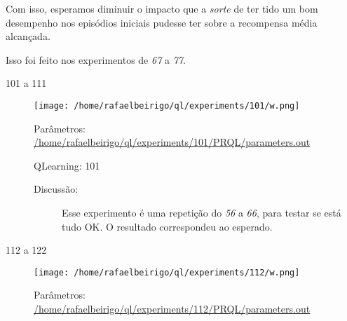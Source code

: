 \documentclass[11pt]{article}
\begin{document}
\begin{description}
\begin{description}
\begin{description}
\begin{description}
\begin{description}
Com isso, esperamos diminuir o impacto que a \emph{sorte} de ter tido um bom
desempenho nos episódios iniciais pudesse ter sobre a recompensa média
alcançada.

Isso foi feito nos experimentos de \emph{67} a \emph{77}.

\end{description}
\end{description}
\begin{description}

\item[101 a 111]\label{sec-11.1.2.1.3.1.2}


\centerline{\texttt{[image: /home/rafaelbeirigo/ql/experiments/101/w.png]}}


\begin{description}

\item[Parâmetros: \href{file:///home/rafaelbeirigo/ql/experiments/101/PRQL/parameters.out}{/home/rafaelbeirigo/ql/experiments/101/PRQL/parameters.out}]\label{sec-11.1.2.1.3.1.2.1}


\end{description}
\begin{description}

\item[QLearning: 101]\label{sec-11.1.2.1.3.1.2.2}


\end{description}
\begin{description}

\item[Discussão:]\label{sec-11.1.2.1.3.1.2.3}


Esse experimento é uma repetição do \emph{56} a \emph{66}, para testar se está tudo OK.
O resultado correspondeu ao esperado.

\end{description}
\end{description}
\begin{description}

\item[112 a 122]\label{sec-11.1.2.1.3.1.3}


\centerline{\texttt{[image: /home/rafaelbeirigo/ql/experiments/112/w.png]}}


\begin{description}

\item[Parâmetros: \href{file:///home/rafaelbeirigo/ql/experiments/112/PRQL/parameters.out}{/home/rafaelbeirigo/ql/experiments/112/PRQL/parameters.out}]\label{sec-11.1.2.1.3.1.3.1}



\end{description}
\end{description}
\end{description}
\end{description}
\end{description}
\end{document}
